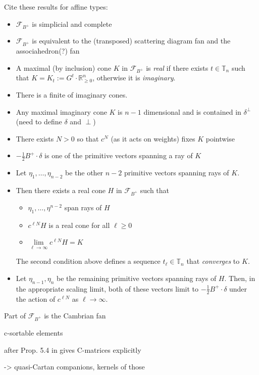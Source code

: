 \documentclass{amsart}
\numberwithin{theorem}{section}
\newcommand{\cF}{\mathcal{F}}
\newcommand{\RR}{\mathbb{R}}
\newcommand{\TT}{\mathbb{T}}
\begin{document}
  Cite these results for affine types:
  \begin{itemize}
    \item $\cF_{B^+}$ is simplicial and complete 
    \item $\cF_{B^+}$ is equivalent to the (transposed) scattering diagram fan and the associahedron(?) fan
    \item A maximal (by inclusion) cone $K$ in $\cF_{B^+}$ is \emph{real} if there exists $t\in\TT_n$ such that $K=K_t:=G^t\cdot\RR^n_{\ge0}$, otherwise it is \emph{imaginary}.
    \item There is a finite of imaginary cones.
    \item Any maximal imaginary cone $K$ is $n-1$ dimensional and is contained in $\delta^\perp$ (need to define $\delta$ and $\perp$)
    \item There exists $N>0$ so that $c^N$ (as it acts on weights) fixes $K$ pointwise
    \item $-\frac12 B^+\cdot\delta$ is one of the primitive vectors spanning a ray of $K$
    \item Let $\eta_1,\ldots,\eta_{n-2}$ be the other $n-2$ primitive vectors spanning rays of $K$.  
    \item Then there exists a real cone $H$ in $\cF_{B^+}$ such that
      \begin{itemize}
        \item $\eta_1,\ldots,\eta^{n-2}$ span rays of $H$
        \item $c^{\ell N} H$ is a real cone for all $\ell\ge0$
        \item $\lim\limits_{\ell\to\infty} c^{\ell N} H = K$
      \end{itemize}
      The second condition above defines a sequence $t_\ell\in\TT_n$ that \emph{converges} to $K$.
    \item Let $\eta_{n-1},\eta_n$ be the remaining primitive vectors spanning rays of $H$.  Then, in the appropriate scaling limit, both of these vectors limit to $-\frac12 B^+\cdot\delta$ under the action of $c^{\ell N}$ as $\ell\to\infty$.
  \end{itemize}

  Part of $\cF_{B^+}$ is the Cambrian fan
  
  c-sortable elements
  
  after Prop. 5.4 in \cite{combinatorial frameworks} gives C-matrices explicitly
  
  -> quasi-Cartan companions, kernels of those
\end{document}
